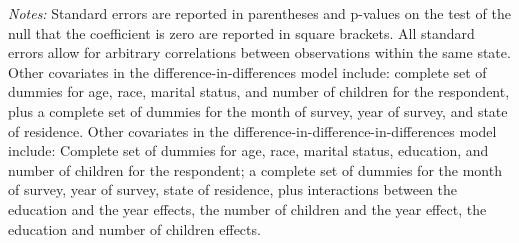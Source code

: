 \begin{table}[htbp]
\centering
\caption{Table 4: Robustness Tests, Women Aged 21--40, 1993--2001 BRFSS}
\begin{minipage}{\linewidth}
\smallskip\footnotesize
\textit{Notes:} Standard errors are reported in parentheses and p-values on the test of the null that the coefficient is zero are reported in square brackets. All standard errors allow for arbitrary correlations between observations within the same state. Other covariates in the difference-in-differences model include: complete set of dummies for age, race, marital status, and number of children for the respondent, plus a complete set of dummies for the month of survey, year of survey, and state of residence. Other covariates in the difference-in-difference-in-differences model include: Complete set of dummies for age, race, marital status, education, and number of children for the respondent; a complete set of dummies for the month of survey, year of survey, state of residence, plus interactions between the education and the year effects, the number of children and the year effect, the education and number of children effects.
\end{minipage}
\end{table}
